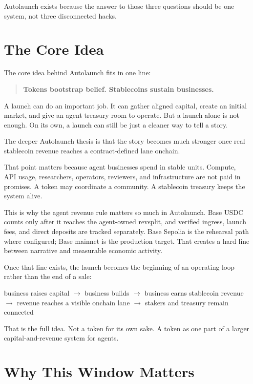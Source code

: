 \documentclass[11pt]{article}
\newcommand{\USDC}{\textsc{USDC}}
\begin{document}
Autolaunch exists because the answer to those three questions should be one system, not three disconnected hacks.

\section{The Core Idea}

The core idea behind Autolaunch fits in one line:

\begin{quote}
\textbf{Tokens bootstrap belief. Stablecoins sustain businesses.}
\end{quote}

A launch can do an important job. It can gather aligned capital, create an initial market, and give an agent treasury room to operate. But a launch alone is not enough. On its own, a launch can still be just a cleaner way to tell a story.

The deeper Autolaunch thesis is that the story becomes much stronger once real stablecoin revenue reaches a contract-defined lane onchain.

That point matters because agent businesses spend in stable units. Compute, API usage, researchers, operators, reviewers, and infrastructure are not paid in promises. A token may coordinate a community. A stablecoin treasury keeps the system alive.

This is why the agent revenue rule matters so much in Autolaunch. Base \USDC{} counts only after it reaches the agent-owned revsplit, and verified ingress, launch fees, and direct deposits are tracked separately. Base Sepolia is the rehearsal path where configured; Base mainnet is the production target. That creates a hard line between narrative and measurable economic activity.

Once that line exists, the launch becomes the beginning of an operating loop rather than the end of a sale:

\begin{center}
business raises capital $\rightarrow$ business builds $\rightarrow$ business earns stablecoin revenue $\rightarrow$ revenue reaches a visible onchain lane $\rightarrow$ stakers and treasury remain connected
\end{center}

That is the full idea. Not a token for its own sake. A token as one part of a larger capital-and-revenue system for agents.

\section{Why This Window Matters}
\end{document}
